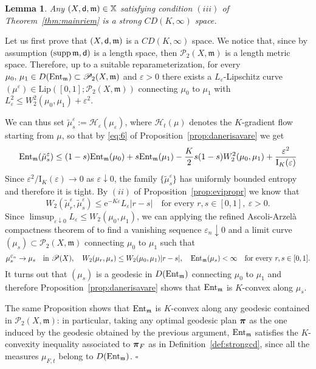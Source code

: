 \documentclass[reqno,11pt]{article}
\numberwithin{equation}{section}
\newcommand{\mm}{{\mbox{\boldmath$m$}}}
\newcommand{\ppi}{{\mbox{\boldmath$\pi$}}}
\newcommand{\sfd}{{\sf d}}
\newcommand{\rme}{{\mathrm e}}
\newcommand{\supp}{\mathop{\rm supp}\nolimits}   %
\newcommand{\down}{\downarrow}              %
\newcommand{\eps}{\varepsilon}
\newcommand{\forevery}{\text{for every }}
\newcommand{\Probabilities}[1]{\mathscr P(#1)}          %
\newcommand{\ProbabilitiesTwo}[1]{\mathscr P_2(#1)}     %
\newenvironment{proof}{\removelastskip\par\medskip   %
\noindent{\em Proof.}
\rm}{\penalty-20\null\hfill$\square$\par\medbreak}
\newtheorem{lemma}[theorem]{Lemma}
\newcommand{\ent}[1]{{\rm Ent}_{\mm}(#1)}              %
\newcommand{\entv}{{\rm Ent}_{\mm}}                    %
\newcommand{\prob}{\Probabilities}
\newcommand{\probt}{\ProbabilitiesTwo}
\newcommand{\X}{\mathbb X}
\newcommand{\heatw}{{\mathscr H}}
\renewcommand{\mm}{\mathfrak m}
\begin{document}
\begin{lemma}
  \label{le:EVISCD}
  Any $(X,\sfd,\mm)\in\X$ satisfying
  condition $(iii)$ of Theorem~\ref{thm:mainriem} is a strong $CD(K,\infty)$ space.
\end{lemma}
\begin{proof}
  Let us first prove that $(X,\sfd,\mm)$ is a $CD(K,\infty)$ space.
  We notice that, since by assumption $(\supp\mm,\sfd)$ is a length space, then
  $\probt{X,\mm}$ is a length metric space.
  Therefore, up to a suitable reparameterization,
  for every $\mu_0,\,\mu_1\in D(\entv)\subset\probt{X,\mm}$ and $\eps>0$
  there exists a $L_\eps$-Lipschitz curve
  $(\mu^\eps)\in \mathrm{Lip}([0,1];\probt{X,\mm})$ connecting $\mu_0$ to
  $\mu_1$ with $L_\eps^2\le W^2_2(\mu_0,\mu_1)+\eps^2.$

  We can thus set $\tilde\mu^\eps_s:=\heatw_\eps(\mu_\eps)$,
  where $\heatw_t(\mu)$ denotes the $K$-gradient flow starting from $\mu$,
  so that by \eqref{eq:6} of Proposition~\ref{prop:danerisavare} we
  get
  \begin{displaymath}
    \ent{\tilde\mu^\eps_s}\le (1-s)\ent{\mu_0}+s\ent{\mu_1}-
    \frac K2s(1-s)W_2^2(\mu_0,\mu_1)+\frac {\eps^2}{\mathrm I_K(\eps)}
  \end{displaymath}
  Since $ {\eps^2}/{\mathrm I_K(\eps)}\to 0$ as $\eps\downarrow 0$,
  the family $\{\tilde\mu^\eps_s\}$ has uniformly bounded entropy and
  therefore
  it is tight. By $(ii)$ of Proposition~\ref{prop:evipropr} we know that
  \begin{displaymath}
    W_2(\tilde\mu^\eps_r,\tilde\mu^\eps_s)\le
    \rme^{-K\eps}L_\eps|r-s|\quad\forevery r,s\in [0,1],\ \eps>0.
  \end{displaymath}
  Since $\limsup_{\eps\down0}L_\eps\le W_2(\mu_0,\mu_1)$,
  we can applying the refined Ascoli-Arzel\`a compactness theorem of
  \cite[Prop.~3.3.1]{Ambrosio-Gigli-Savare08} to find a vanishing
  sequence $\eps_n\downarrow0$ and a limit curve $(\mu_s)\subset
  \probt{X,\mm}$ connecting
  $\mu_0$ to $\mu_1$ such that
  \begin{displaymath}
    \mu^{\eps_n}_s\to\mu_s\quad\text{in }\prob{X},\quad
    W_2(\mu_r,\mu_s)\le W_2(\mu_0,\mu_1)|r-s|,\quad
    \ent{\mu_s}<\infty\quad\forevery r,s\in [0,1].
  \end{displaymath}
  It turns out that $(\mu_s)$ is a geodesic in $D(\entv)$ connecting
  $\mu_0$ to $\mu_1$ and therefore Proposition~\ref{prop:danerisavare}
  shows that $\entv$ is $K$-convex along $\mu_s$.

  The same Proposition shows that $\entv$ is $K$-convex along any
  geodesic contained in $\probt{X,\mm}$: in particular,
  taking any optimal geodesic plan $\ppi$ as the one induced by
  the geodesic obtained by the previous argument,
  $\entv$ satisfies the $K$-convexity inequality associated to
  $\ppi_F$ as in Definition~\ref{def:strongcd}, since all the measures
  $\mu_{F,t}$ belong to $D(\entv)$.
\end{proof}
\end{document}
